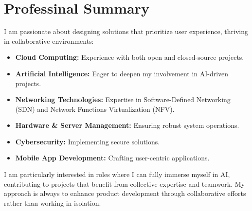 \documentclass[letter,10pt]{article} %
\begin{document}

\section{Professinal Summary}
I am passionate about designing solutions that prioritize user experience, thriving in collaborative environments:

\begin{itemize}
    \setlength{\itemsep}{1pt} %
	\setlength{\parskip}{0pt}  %
	\setlength{\parsep}{0pt}   %
	\item \textbf{Cloud Computing:} Experience with both open and closed-source projects.
	\item \textbf{Artificial Intelligence:} Eager to deepen my involvement in AI-driven projects.
	\item \textbf{Networking Technologies:} Expertise in Software-Defined Networking (SDN) and Network Functions Virtualization (NFV).
	\item \textbf{Hardware \& Server Management:} Ensuring robust system operations.
	\item \textbf{Cybersecurity:} Implementing secure solutions.
	\item \textbf{Mobile App Development:} Crafting user-centric applications.
\end{itemize}

I am particularly interested in roles where I can fully immerse myself in AI, contributing to projects that benefit from collective expertise and teamwork. My approach is always to enhance product development through collaborative efforts rather than working in isolation.


\end{document}
